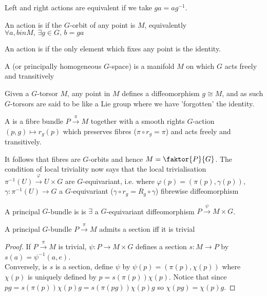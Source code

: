 \documentclass{article}
\begin{document}
Left and right actions are equivalent if we take $ga = ag^{-1}$. 
\begin{definition}
	An action is  if the $G$-orbit of any point is $M$, equivalently $\forall a,b in M, \, \exists g \in G, \, b = ga$
\end{definition}

\begin{definition}
	An action is  if the only element which fixes any point is the identity. 
\end{definition}

\begin{definition}
	A  (or principally homogeneous $G$-space) is a manifold $M$ on which $G$ acts freely and transitively
\end{definition}
Given a $G$-torsor $M$, any point in $M$ defines a diffeomorphism $g \cong M$, and as such $G$-torsors are said to be like a Lie group where we have 'forgotten' the identity. 

\begin{definition}
	A  is a fibre bundle $P\overset{\pi}{\to}M$ together with a smooth rights $G$-action $(p,g)\mapsto r_g(p)$ which preserves fibres ($\pi\circ r_g = \pi$) and acts freely and transitively. 
\end{definition}
It follows that fibres are $G$-orbits and hence $M = \faktor{P}{G}$. The condition of local triviality now says that the local trivialisation $\pi^{-1}(U) \overset{\varphi}{\to} U \times G$ are $G$-equivariant, i.e. where $\varphi(p) = (\pi(p),\gamma(p))$, $\gamma:\pi^{-1}(U) \to G$ a $G$-equivariant ($\gamma \circ r_g = R_g \circ \gamma$) fibrewise diffeomorphism

\begin{definition}
	A principal $G$-bundle is  is $\exists$ a $G$-equivariant diffeomorphism $P\overset{\psi}{\to} M \times G$.
\end{definition}

\begin{prop}
	A principal $G$-bundle $P\overset{\pi}{\to}M$ admits a section iff it is trivial
\end{prop}
\begin{proof}
	If $P\overset{\pi}{\to}M$ is trivial, $\psi : P \to M \times G$ defines a section $s : M \to P$ by $s(a) = \psi^{-1}(a,e)$. \\
	Conversely, is $s$ is a section, define $\psi$ by $\psi(p) = (\pi(p),\chi(p))$ where $\chi(p)$ is uniquely defined by $p = s(\pi(p))\chi(p)$. Notice that since $pg = s(\pi(p))\chi(p)g = s(\pi(pg))\chi(p)g $ so $\chi(pg) = \chi(p)g$. 
\end{proof}
\end{document}
